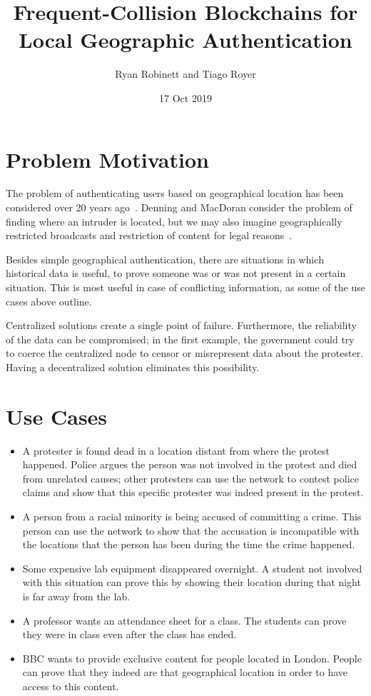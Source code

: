 \documentclass{article}
\title{Frequent-Collision Blockchains for Local Geographic Authentication}
\author{Ryan Robinett and Tiago Royer}
\date{17 Oct 2019}
\begin{document}
\maketitle

\section*{Problem Motivation}

The problem of authenticating users based on geographical location
has been considered over 20 years ago~\cite{denning_1996}.
Denning and MacDoran consider the problem of finding where an intruder is located,
but we may also imagine geographically restricted broadcasts
and restriction of content for legal reasons~\cite{gdpr}.

Besides simple geographical authentication,
there are situations in which historical data is useful,
to prove someone was or was not present in a certain situation.
This is most useful in case of conflicting information,
as some of the use cases above outline.

Centralized solutions create a single point of failure.
Furthermore,
the reliability of the data can be compromised;
in the first example,
the government could try to coerce the centralized node
to censor or misrepresent data about the protester.
Having a decentralized solution eliminates this possibility.


\section*{Use Cases}

\begin{itemize}
	\item A protester is found dead in a location distant from where the protest happened.
		Police argues the person was not involved in the protest
		and died from unrelated causes;
		other protesters can use the network to contest police claims
		and show that this specific protester was indeed present in the protest.

	\item A person from a racial minority is being accused of committing a crime.
		This person can use the network to show that the accusation
		is incompatible with the locations that the person has been
		during the time the crime happened.

	\item Some expensive lab equipment disappeared overnight.
		A student not involved with this situation
		can prove this by showing their location during that night
		is far away from the lab.

	\item A professor wants an attendance sheet for a class.
		The students can prove they were in class
		even after the class has ended.

	\item BBC wants to provide exclusive content for people located in London.
		People can prove that they indeed are that geographical location
		in order to have access to this content.
\end{itemize}
\end{document}
